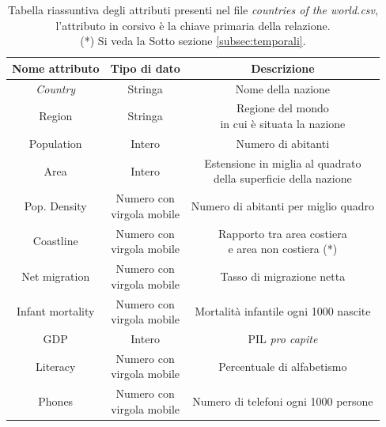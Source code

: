 \begin{table}
	\caption{Tabella riassuntiva degli attributi presenti nel file \textit{countries of the world.csv}, l'attributo in corsivo è la chiave primaria della relazione.\\(*) Si veda la Sotto sezione \ref{subsec:temporali}.}

	\label{tab:world_countires_att}

	\centering
	\begin{tabular}{|c|c|c|}
		\hline
		\textbf{Nome attributo} & \textbf{Tipo di dato} & \textbf{Descrizione} \\ 
		\hline  
		\rule{0pt}{13pt}\emph{Country} & Stringa & Nome della nazione \\ 
		\hline  
		\rule{0pt}{24pt}Region & Stringa & \shortstack{Regione del mondo \\ in cui è situata la nazione} \\ 
		\hline  
		\rule{0pt}{13pt}Population & Intero & Numero di abitanti \\ 
		\hline  
		\rule{0pt}{24pt}Area & Intero & \shortstack{Estensione in miglia al quadrato \\ della superficie della nazione} \\
		\hline   
		\rule{0pt}{24pt}Pop. Density & \shortstack{Numero con \\ virgola mobile} & Numero di abitanti per miglio quadro \\ 
		\hline   
		\rule{0pt}{24pt}Coastline & \shortstack{Numero con \\ virgola mobile} & \shortstack{Rapporto tra area costiera \\ e area non costiera (*)} \\ 
		\hline   
		\rule{0pt}{24pt}Net migration & \shortstack{Numero con \\ virgola mobile} & Tasso di migrazione netta \\ 
		\hline  
		\rule{0pt}{24pt}Infant mortality & \shortstack{Numero con \\ virgola mobile} & Mortalità infantile ogni 1000 nascite \\ 
		\hline  
		\rule{0pt}{13pt}GDP & Intero & PIL \textit{pro capite} \\ 
		\hline  
		\rule{0pt}{24pt}Literacy & \shortstack{Numero con \\ virgola mobile} & Percentuale di alfabetismo \\ 
		\hline  
		\rule{0pt}{24pt}Phones & \shortstack{Numero con \\ virgola mobile} & Numero di telefoni ogni 1000 persone \\ 

\end{tabular}
\end{table}
